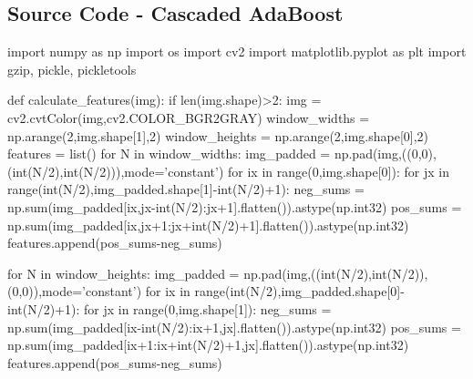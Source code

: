 \documentclass{article}
\begin{document}
\subsection{Source Code - Cascaded AdaBoost}
\begin{python}
import numpy as np
import os
import cv2
import matplotlib.pyplot as plt
import gzip, pickle, pickletools

def calculate_features(img):
	if len(img.shape)>2:
		img = cv2.cvtColor(img,cv2.COLOR_BGR2GRAY)
	window_widths = np.arange(2,img.shape[1],2)
	window_heights = np.arange(2,img.shape[0],2)
	features = list()
	for N in window_widths:
		img_padded = np.pad(img,((0,0),(int(N/2),int(N/2))),mode='constant')
		for ix in range(0,img.shape[0]):
			for jx in range(int(N/2),img_padded.shape[1]-int(N/2)+1):
				neg_sums = np.sum(img_padded[ix,jx-int(N/2):jx+1].flatten()).astype(np.int32)
				pos_sums = np.sum(img_padded[ix,jx+1:jx+int(N/2)+1].flatten()).astype(np.int32)
				features.append(pos_sums-neg_sums)

	for N in window_heights:
		img_padded = np.pad(img,((int(N/2),int(N/2)),(0,0)),mode='constant')
		for ix in range(int(N/2),img_padded.shape[0]-int(N/2)+1):
			for jx in range(0,img.shape[1]):
				neg_sums = np.sum(img_padded[ix-int(N/2):ix+1,jx].flatten()).astype(np.int32)
				pos_sums = np.sum(img_padded[ix+1:ix+int(N/2)+1,jx].flatten()).astype(np.int32)
				features.append(pos_sums-neg_sums)


\end{python}
\end{document}
